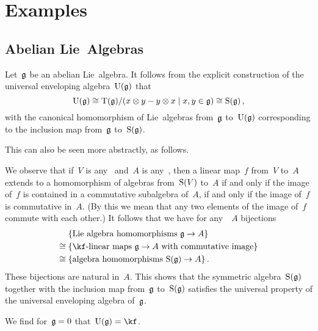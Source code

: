 \section{Examples}




\subsection{Abelian Lie~Algebras}


\begin{examples}
	Let~$\mathfrak{g}$ be an abelian Lie~algebra.
	It follows from the explicit construction of the universal enveloping algebra~$\operatorname{U}(\mathfrak{g})$ that
	\[
		\Univ(\glie)
		\cong
		\Tensor(\glie)/(x \tensor y - y \tensor x \suchthat x, y \in \glie)
		\cong
		\Symm(\glie) \,,
	\]
	with the canonical homomorphism of Lie~algebras from~$\mathfrak{g}$ to~$\operatorname{U}(\mathfrak{g})$ corresponding to the inclusion map from~$\mathfrak{g}$ to~$\operatorname{S}(\mathfrak{g})$.

	This can also be seen more abstractly, as follows.
	
	We observe that if~$V$ is any~\vectorspace{$\kf$} and~$A$ is any~\algebra{$\kf$}, then a linear map~$f$ from~$V$ to~$A$ extends to a homomorphism of algebras from~$\operatorname{S}(V)$ to~$A$ if and only if the image of~$f$ is contained in a commutative subalgebra of~$A$, if and only if the image of~$f$ is commutative in~$A$.
	(By this we mean that any two elements of the image of~$f$ commute with each other.)
	It follows that we have for any~\algebra{$\kf$}~$A$ bijections
	\begin{align*}
		{}&
		\{ \textstyle \text{Lie~algebra homomorphisms~$\glie \to A$} \}
		\\
		\cong{}&
		\{ \textstyle \text{{\linear{$\kf$}} maps~$\glie \to A$ with commutative image} \}
		\\
		\cong{}&
		\{ \textstyle \text{algebra homomorphisms~$\Symm(\glie) \to A$} \} \,.
	\end{align*}
	These bijections are natural in~$A$.
	This shows that the symmetric algebra~$\operatorname{S}(\mathfrak{g})$ together with the inclusion map from~$\mathfrak{g}$ to~$\operatorname{S}(\mathfrak{g})$ satisfies the universal property of the universal enveloping algebra of~$\mathfrak{g}$.
\end{examples}


\begin{example}
	We find for~$\mathfrak{g} = 0$ that~$\Univ(\glie) = \kf$.
\end{example}


